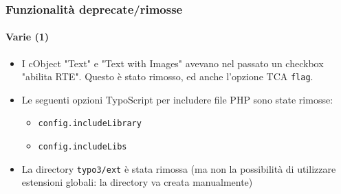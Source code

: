 \begin{frame}[fragile]
	\frametitle{Funzionalità deprecate/rimosse}
	\framesubtitle{Varie (1)}

	\begin{itemize}
 
		\item I cObject "Text" e "Text with Images" avevano nel passato un checkbox "abilita RTE".
			Questo è stato rimosso, ed anche l'opzione TCA \texttt{flag}.

		\item Le seguenti opzioni TypoScript per includere file PHP sono state rimosse:

			\begin{itemize}
				\item \texttt{config.includeLibrary}
				\item \texttt{config.includeLibs}
			\end{itemize}

		\item La directory \texttt{typo3/ext} è stata rimossa\newline
			\small
				(ma non la possibilità di utilizzare estensioni globali: la directory va creata manualmente)
			\normalsize

	\end{itemize}

\end{frame}


